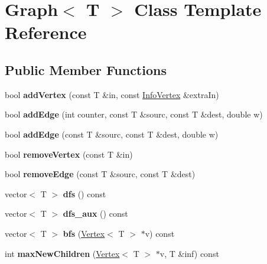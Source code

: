 \hypertarget{class_graph}{}\section{Graph$<$ T $>$ Class Template Reference}
\label{class_graph}
\subsection*{Public Member Functions}
\begin{DoxyCompactItemize}
\item 
\hypertarget{class_graph_a15c29753b1426a746cd71391d252eae1}{}\label{class_graph_a15c29753b1426a746cd71391d252eae1} 
bool {\bfseries add\+Vertex} (const T \&in, const \hyperlink{class_info_vertex}{Info\+Vertex} \&extra\+In)
\item 
\hypertarget{class_graph_ac651082b034fd10f007df5545172c3d2}{}\label{class_graph_ac651082b034fd10f007df5545172c3d2} 
bool {\bfseries add\+Edge} (int counter, const T \&sourc, const T \&dest, double w)
\item 
\hypertarget{class_graph_ac61af3aafe6277215f5a3b3cc7d58ce2}{}\label{class_graph_ac61af3aafe6277215f5a3b3cc7d58ce2} 
bool {\bfseries add\+Edge} (const T \&sourc, const T \&dest, double w)
\item 
\hypertarget{class_graph_af9c903104ad69a7782979fa9caedf163}{}\label{class_graph_af9c903104ad69a7782979fa9caedf163} 
bool {\bfseries remove\+Vertex} (const T \&in)
\item 
\hypertarget{class_graph_a1106092a37366486cf55576f9ec01692}{}\label{class_graph_a1106092a37366486cf55576f9ec01692} 
bool {\bfseries remove\+Edge} (const T \&sourc, const T \&dest)
\item 
\hypertarget{class_graph_a911798b1a89f8c4ae90ba3eee849cff8}{}\label{class_graph_a911798b1a89f8c4ae90ba3eee849cff8} 
vector$<$ T $>$ {\bfseries dfs} () const
\item 
\hypertarget{class_graph_a99d15f810591df9074cb97ba480a3ed4}{}\label{class_graph_a99d15f810591df9074cb97ba480a3ed4} 
vector$<$ T $>$ {\bfseries dfs\+\_\+aux} () const
\item 
\hypertarget{class_graph_a56a5ea2c3aa7c0bd3849849be404a631}{}\label{class_graph_a56a5ea2c3aa7c0bd3849849be404a631} 
vector$<$ T $>$ {\bfseries bfs} (\hyperlink{class_vertex}{Vertex}$<$ T $>$ $\ast$v) const
\item 
\hypertarget{class_graph_a675559f8cddfe43bc416023ad9f28cfa}{}\label{class_graph_a675559f8cddfe43bc416023ad9f28cfa} 
int {\bfseries max\+New\+Children} (\hyperlink{class_vertex}{Vertex}$<$ T $>$ $\ast$v, T \&inf) const

\end{DoxyCompactItemize}

